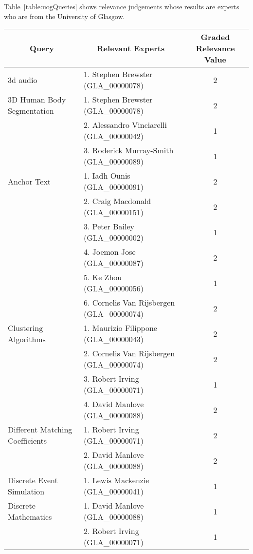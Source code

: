 

Table~\ref{table:uogQueries} shows relevance judgements whose results are experts who are from the University of Glasgow.

\footnotesize
\begin{longtable}{|l|l|c|}

\hline \multicolumn{1}{|c|}{\textbf{Query}} & \multicolumn{1}{|c|}{\textbf{Relevant Experts}} & \multicolumn{1}{|c|}{\textbf{Graded Relevance Value}} \\
\hline 3d audio & 1. Stephen Brewster (GLA\_00000078) & 2 \\
\hline 3D Human Body Segmentation & 1. Stephen Brewster (GLA\_00000078) & 2\\
\hline  & 2. Alessandro Vinciarelli (GLA\_00000042) & 1 \\
\hline  & 3. Roderick Murray-Smith (GLA\_00000089) & 1 \\  
\hline Anchor Text & 1. Iadh Ounis (GLA\_00000091) & 2 \\ 
\hline  & 2. Craig Macdonald (GLA\_00000151) & 2 \\ 
\hline  & 3. Peter Bailey (GLA\_00000002) & 1 \\ 
\hline  & 4. Joemon Jose (GLA\_00000087) & 2 \\ 
\hline  & 5. Ke Zhou (GLA\_00000056) & 1 \\ 
\hline  & 6. Cornelis Van Rijsbergen (GLA\_00000074) & 2 \\ 
\hline Clustering Algorithms & 1. Maurizio Filippone (GLA\_00000043) & 2 \\ 
\hline  & 2. Cornelis Van Rijsbergen (GLA\_00000074) & 2 \\ 
\hline  & 3. Robert Irving (GLA\_00000071) & 1 \\ 
\hline  & 4. David Manlove (GLA\_00000088) & 2 \\ 
\hline Different Matching Coefficients & 1. Robert Irving (GLA\_00000071) & 2 \\ 
\hline  & 2. David Manlove (GLA\_00000088) & 2 \\ 
\hline Discrete Event Simulation & 1. Lewis Mackenzie (GLA\_00000041) & 1 \\ 
\hline Discrete Mathematics & 1. David Manlove (GLA\_00000088) & 1 \\ 
\hline  & 2. Robert Irving (GLA\_00000071) & 1 \\ 

\end{longtable}
